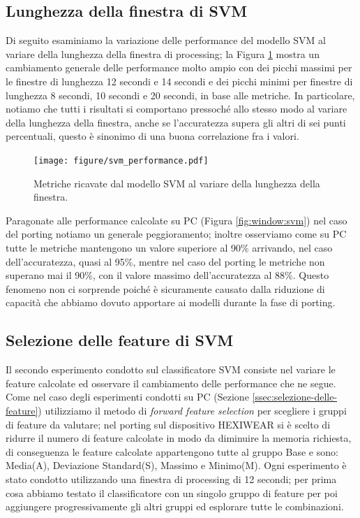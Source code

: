 \subsection{Lunghezza della finestra di SVM}
\label{ssec:lunghezza-della-finestra-hexi}

Di seguito esaminiamo la variazione delle performance del modello SVM al variare della lunghezza della finestra di processing; la Figura \ref{fig:metrics-svm-window-hexi} mostra un cambiamento generale delle performance molto ampio con dei picchi massimi per le finestre di lunghezza 12 secondi e 14 secondi e dei picchi minimi per finestre di lunghezza 8 secondi, 10 secondi e 20 secondi, in base alle metriche. In particolare, notiamo che tutti i risultati si comportano pressoché allo stesso modo al variare della lunghezza della finestra, anche se l'accuratezza supera gli altri di sei punti percentuali, questo è sinonimo di una buona correlazione fra i valori.

\begin{figure}[!htb]
    \centering
    \texttt{[image: figure/svm\_performance.pdf]}
    \caption{Metriche ricavate dal modello SVM al variare della lunghezza della finestra.}
    \label{fig:metrics-svm-window-hexi}
\end{figure}

Paragonate alle performance calcolate su PC (Figura \ref{fig:window:svm}) nel caso del porting notiamo un generale peggioramento; inoltre osserviamo come su PC tutte le metriche mantengono un valore superiore al 90\% arrivando, nel caso dell'accuratezza, quasi al 95\%, mentre nel caso del porting le metriche non superano mai il 90\%, con il valore massimo dell'accuratezza al 88\%. Questo fenomeno non ci sorprende poiché è sicuramente causato dalla riduzione di capacità che abbiamo dovuto apportare ai modelli durante la fase di porting.

\subsection{Selezione delle feature di SVM}
\label{ssec:selezione-delle-feature-di-svm-hexi}

Il secondo esperimento condotto sul classificatore SVM consiste nel variare le feature calcolate ed osservare il cambiamento delle performance che ne segue. 
Come nel caso degli esperimenti condotti su PC (Sezione \ref{ssec:selezione-delle-feature}) utilizziamo il metodo di \textit{forward feature selection} per scegliere i gruppi di feature da valutare; nel porting sul dispositivo HEXIWEAR si è scelto di ridurre il numero di feature calcolate in modo da diminuire la memoria richiesta, di conseguenza le feature calcolate appartengono tutte al gruppo Base e sono: Media(A), Deviazione Standard(S), Massimo e Minimo(M).
Ogni esperimento è stato condotto utilizzando una finestra di processing di 12 secondi; per prima cosa abbiamo testato il classificatore con un singolo gruppo di feature per poi aggiungere progressivamente gli altri gruppi ed esplorare tutte le combinazioni.


